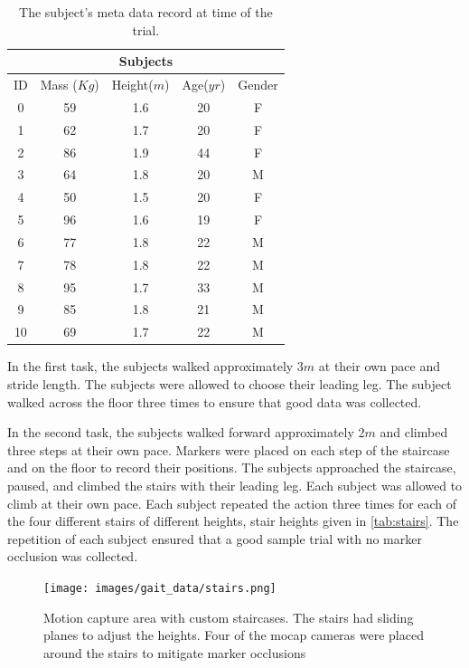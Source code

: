 \begin{table}[h!]
\centering
 \begin{tabular}{|c c c c c|} 
 \hline 
 \multicolumn{5}{|c|}{Subjects} \\
 \hline
 ID & Mass ($Kg$) &  Height($m$)  & Age($yr$)  & Gender \\ [0.5ex] 
 \hline\hline
 0 & 59 & 1.6 & 20 & F \\
 \hline
 1 & 62 & 1.7 & 20 & F \\ 
 \hline
 2 & 86 & 1.9 & 44 & F \\
 \hline
 3 & 64 & 1.8 & 20 & M \\ 
 \hline
 4 & 50 & 1.5 & 20 & F \\
 \hline
 5 & 96 & 1.6 &  19 & F\\
 \hline
 6 & 77 & 1.8 & 22 & M \\
 \hline
 7 & 78 & 1.8 & 22 & M \\
 \hline
 8 & 95 & 1.7 & 33 & M \\
 \hline
 9 & 85 & 1.8 & 21 & M \\
 \hline
 10 & 69 & 1.7 & 22 & M \\[1ex] 
 \hline
\end{tabular}
\caption[Subject Table]{The subject's meta data record at time of the trial.}
\label{tab:subjects}
\end{table}



 In the first task, the subjects walked approximately 3$m$ at their own pace and stride length\cite{peters2014concurrent}. The subjects were allowed to choose their leading leg. The subject walked across the floor three times to ensure that good data was collected. 

 In the second task, the subjects walked forward approximately 2$m$ and climbed three steps at their own pace. Markers were placed on each step of the staircase and on the floor to record their positions. The subjects approached the staircase, paused, and climbed the stairs with their leading leg. Each subject was allowed to climb at their own pace. Each subject repeated the action three times for each of the four different stairs of different heights, stair heights given in \autoref{tab:stairs}. The repetition of each subject ensured that a good sample trial with no marker occlusion was collected.   
 \begin{figure}[h]
    \centering 
    \texttt{[image: images/gait\_data/stairs.png]}
    \caption[Motion Capture Area]{Motion capture area with custom staircases. The stairs had sliding planes to adjust the heights. Four of the mocap cameras were placed around the stairs to mitigate marker occlusions}
    \label{fig:mocap} 
\end{figure} 
 
